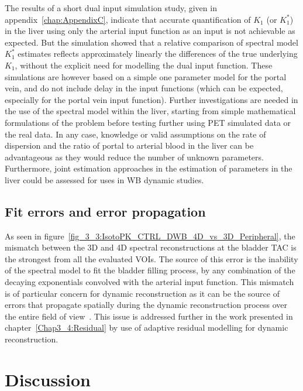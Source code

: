 The results of a short dual input simulation study, given in appendix~\ref{chap:AppendixC}, indicate that accurate quantification of $K_1$ (or $K_1^{*}$) in the liver using only the arterial input function as an input is not achievable as expected. 
But the simulation showed that a relative comparison of spectral model $K_1^{*}$ estimates reflects approximately linearly the differences of the true underlying $K_1$, without the explicit need for modelling the dual input function. These simulations are however based on a simple one parameter model for the portal vein, and do not include delay in the input functions (which can be expected, especially for the portal vein input function).
Further investigations are needed in the use of the spectral model within the liver, starting from simple mathematical formulations of the problem before testing further using PET simulated data or the real data. In any case, knowledge or valid assumptions on the rate of dispersion and the ratio of portal to arterial blood in the liver can be advantageous as they would reduce the number of unknown parameters. Furthermore, joint estimation approaches in the estimation of parameters in the liver could be assessed for uses in WB dynamic studies.

\subsection{Fit errors and error propagation}
\label{sub_section:residuals}
As seen in figure~\ref{fig_3_3:IsotoPK_CTRL_DWB_4D_vs_3D_Peripheral}, the mismatch between the 3D and 4D spectral reconstructions at the bladder TAC is the strongest from all the evaluated VOIs. The source of this error is the inability of the spectral model to fit the bladder filling process, by any combination of the decaying exponentials convolved with the arterial input function. This mismatch is of particular concern for dynamic reconstruction as it can be the source of errors that propagate spatially during the dynamic reconstruction process over the entire field of view~\cite{Kotasidis2014c,Kotasidis2016a}. 
This issue is addressed further in the work presented in chapter~\ref{Chap3_4:Residual} by use of adaptive residual modelling for dynamic reconstruction.

\section{Discussion}

